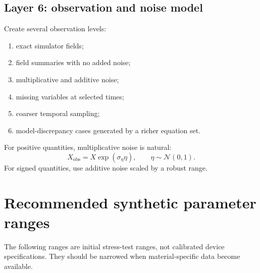 \documentclass[11pt]{article}
\begin{document}
\subsection{Layer 6: observation and noise model}

Create several observation levels:
\begin{enumerate}[leftmargin=1.6em]
    \item exact simulator fields;
    \item field summaries with no added noise;
    \item multiplicative and additive noise;
    \item missing variables at selected times;
    \item coarser temporal sampling;
    \item model-discrepancy cases generated by a richer equation set.
\end{enumerate}
For positive quantities, multiplicative noise is natural:
\begin{equation}
X_{\mathrm{obs}}=X\exp(\sigma_\eta\eta),\qquad \eta\sim\mathcal{N}(0,1).
\end{equation}
For signed quantities, use additive noise scaled by a robust range.

\section{Recommended synthetic parameter ranges}

The following ranges are initial stress-test ranges, not calibrated device specifications. They should be narrowed when material-specific data become available.
\end{document}
